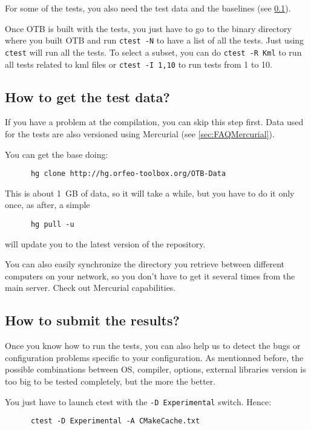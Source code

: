 For some of the tests, you also need the test data and the baselines (see \ref{sec:FAQTestData}).

Once OTB is built with the tests, you just have to go to the binary directory where you built OTB and run \texttt{ctest -N} to have a list of all the tests. Just using \texttt{ctest} will run all the tests. To select a subset, you can do \texttt{ctest -R Kml} to run all tests related to kml files or \texttt{ctest -I 1,10} to run tests from 1 to 10.

\subsection{How to get the test data?}\label{sec:FAQTestData}

If you have a problem at the compilation, you can skip this step first.
Data used for the tests are also versioned using Mercurial (see \ref{sec:FAQMercurial}).

You can get the base doing:
\begin{verbatim}
      hg clone http://hg.orfeo-toolbox.org/OTB-Data
\end{verbatim}

This is about 1~GB of data, so it will take a while, but you have to do it only once, as after, a simple
\begin{verbatim}
      hg pull -u
\end{verbatim}
will update you to the latest version of the repository.

You can also easily synchronize the directory you retrieve between different computers on your network, so you don't have to get it several times from the main server. Check out Mercurial capabilities.

\subsection{How to submit the results?}

Once you know how to run the tests, you can also help us to detect the bugs or configuration problems specific to your configuration. As mentionned before, the possible combinations between OS, compiler, options, external libraries version is too big to be tested completely, but the more the better.

You just have to launch ctest with the \texttt{-D Experimental} switch. Hence:
\begin{verbatim}
      ctest -D Experimental -A CMakeCache.txt
\end{verbatim}

